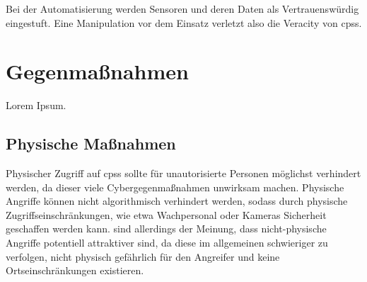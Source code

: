 \documentclass[final,bibliography=totocnumbered]{include/sikseminar}
\newcommand{\cps}{\glspl{cps}\xspace}
\begin{document}
Bei der Automatisierung werden Sensoren und deren Daten als Vertrauenswürdig eingestuft.
Eine Manipulation vor dem Einsatz verletzt also die Veracity von \cps.


%



\section{Gegenmaßnahmen}\label{sec:gegenmassnahmen}





%

Lorem Ipsum.

\subsection{Physische Maßnahmen}\label{subsec:physisch}
Physischer Zugriff auf \cps sollte für unautorisierte Personen möglichst verhindert werden, da dieser viele Cybergegenmaßnahmen unwirksam machen.
Physische Angriffe können nicht algorithmisch verhindert werden, sodass durch physische Zugriffseinschränkungen, wie etwa Wachpersonal oder Kameras Sicherheit geschaffen werden kann.
\citeauthor{CAS08} sind allerdings der Meinung, dass nicht-physische Angriffe potentiell attraktiver sind, da diese im allgemeinen schwieriger zu verfolgen, nicht physisch gefährlich für den Angreifer und keine Ortseinschränkungen existieren.
\end{document}
